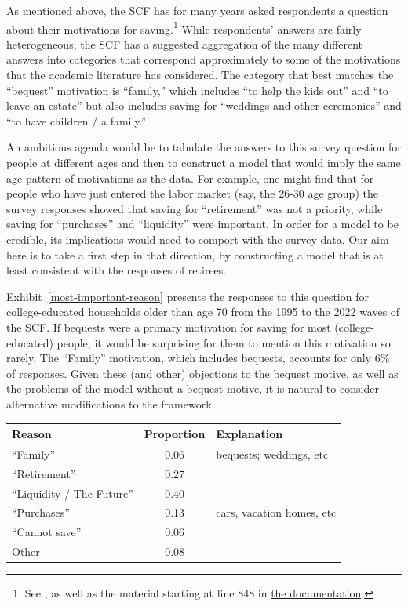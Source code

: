 \documentclass[12pt,letterpaper, fleqn]{article}
\begin{document}
As mentioned above, the SCF has for many years asked respondents a question about their motivations for saving.\footnote{See \cite{FRB2023}, as well as the material starting at line 848 in \href{https://www.federalreserve.gov/econres/files/bulletin.macro.txt}{the documentation}.}
While respondents' answers are fairly heterogeneous, the SCF has a suggested aggregation of the many different answers into categories that correspond approximately to some of the motivations that the academic literature has considered.
The category that best matches the ``bequest'' motivation is ``family,'' which includes ``to help the kids out'' and ``to leave an estate'' but also includes saving for ``weddings and other ceremonies'' and ``to have children / a family.''

An ambitious agenda would be to tabulate the answers to this survey question for people at different ages and then to construct a model that would imply the same age pattern of motivations as the data.
For example, one might find that for people who have just entered the labor market (say, the 26-30 age group) the survey responses showed that saving for ``retirement'' was not a priority, while saving for ``purchases'' and ``liquidity'' were important.
In order for a model to be credible, its implications would need to comport with the survey data.
Our aim here is to take a first step in that direction, by constructing a model that is at least consistent with the responses of retirees.

Exhibit~\ref{most-important-reason} presents the responses to this question for college-educated households older than age 70 from the 1995 to the 2022 waves of the SCF.
If bequests were a primary motivation for saving for most (college-educated) people, it would be surprising for them to mention this motivation so rarely. The ``Family'' motivation, which includes bequests, accounts for only 6\% of responses.
Given these (and other) objections to the bequest motive, as well as the problems of the model without a bequest motive, it is natural to consider alternative modifications to the framework.

\begin{exhibit}[t!]
\centering
\caption{Most Important Reason for Saving, 1995-2022 SCF Waves}\label{most-important-reason}
\begin{tabular}{lcl}
\toprule
Reason & Proportion & Explanation \\
\midrule
``Family'' & 0.06 & bequests; weddings, etc \\
``Retirement'' & 0.27 &  \\
``Liquidity / The Future'' & 0.40 &  \\
``Purchases'' & 0.13 & cars, vacation homes, etc \\
``Cannot save'' & 0.06 &  \\
Other & 0.08 &  \\
\bottomrule
\end{tabular}
\end{exhibit}
\end{document}

